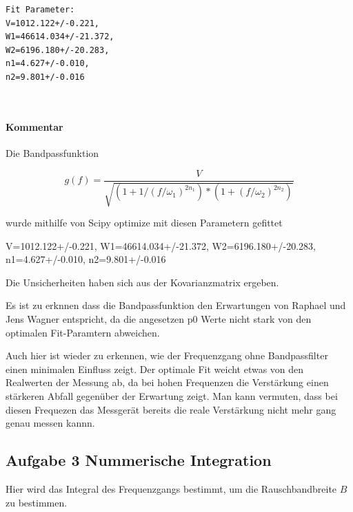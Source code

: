    \begin{Verbatim}[commandchars=\\\{\}]
Fit Parameter:
V=1012.122+/-0.221,
W1=46614.034+/-21.372,
W2=6196.180+/-20.283,
n1=4.627+/-0.010,
n2=9.801+/-0.016
    \end{Verbatim}
 
            
    
    \begin{center}
    \end{center}
    { \hspace*{\fill} \\}
    

    \hypertarget{kommentar}{%
\paragraph{Kommentar}\label{kommentar}}

Die Bandpassfunktion

\[ g(f) = \frac{V}{\sqrt{(1+1/(f/\omega_1)^{2n_1})*(1+(f/\omega_2)^{2n_2})}}\]

wurde mithilfe von Scipy optimize mit diesen Parametern gefittet

V=1012.122+/-0.221, W1=46614.034+/-21.372, W2=6196.180+/-20.283,
n1=4.627+/-0.010, n2=9.801+/-0.016

Die Unsicherheiten haben sich aus der Kovarianzmatrix ergeben.

Es ist zu erknnen dass die Bandpassfunktion den Erwartungen von Raphael
und Jens Wagner entspricht, da die angesetzen p0 Werte nicht stark von
den optimalen Fit-Paramtern abweichen.

Auch hier ist wieder zu erkennen, wie der Frequenzgang ohne
Bandpassfilter einen minimalen Einfluss zeigt. Der optimale Fit weicht
etwas von den Realwerten der Messung ab, da bei hohen Frequenzen die
Verstärkung einen stärkeren Abfall gegenüber der Erwartung zeigt. Man
kann vermuten, dass bei diesen Frequezen das Messgerät bereits die reale
Verstärkung nicht mehr gang genau messen kannn.

    \hypertarget{aufgabe-3-nummerische-integration}{%
\subsection{Aufgabe 3 Nummerische
Integration}\label{aufgabe-3-nummerische-integration}}

Hier wird das Integral des Frequenzgangs bestimmt, um die
Rauschbandbreite \(B\) zu bestimmen.

